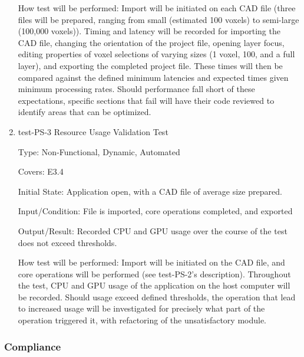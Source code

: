 \documentclass[12pt, titlepage]{article}
\begin{document}
\begin{enumerate}
How test will be performed: Import will be initiated on each CAD file (three files will be prepared, ranging from small (estimated 100 voxels)
to semi-large (100,000 voxels)). Timing and latency will be recorded for importing the CAD file, changing the orientation of the 
project file, opening layer focus, editing properties of voxel selections of varying sizes (1 voxel, 100, and a full layer), and exporting
the completed project file. These times will then be compared against the defined minimum latencies and expected times given minimum processing
rates. Should performance fall short of these expectations, specific sections that fail will have their code reviewed to identify areas 
that can be optimized. %

\item{test-PS-3 Resource Usage Validation Test\\}

Type: Non-Functional, Dynamic, Automated

Covers: E3.4 %
					
Initial State: Application open, with a CAD file of average size prepared.
					
Input/Condition: File is imported, core operations completed, and exported
					
Output/Result: Recorded CPU and GPU usage over the course of the test does not exceed thresholds. %
					
How test will be performed: Import will be initiated on the CAD file, and core operations will be performed (see test-PS-2's description). 
Throughout the test, CPU and GPU usage of the application on the host computer will be recorded. Should usage exceed defined thresholds, the operation
that lead to increased usage will be investigated for precisely what part of the operation triggered it, with refactoring of the unsatisfactory module.

\end{enumerate}

\subsubsection{Compliance}
\end{document}
